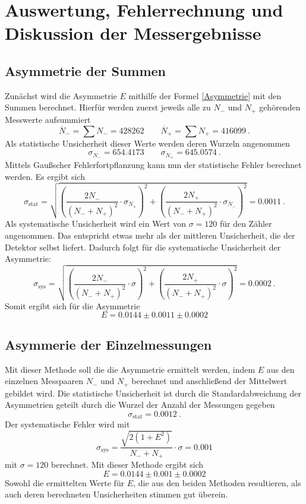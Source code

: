 \chapter{Auswertung, Fehlerrechnung und Diskussion der Messergebnisse}
\section{Asymmetrie der Summen}
Zunächst wird die Asymmetrie $E$ mithilfe der Formel \ref{Asymmetrie} mit den Summen berechnet. Hierfür werden zuerst jeweils alle zu $N_{-}$ und $N_{+}$ gehörenden Messwerte aufsummiert
 \begin{equation*}
     \overline{N}_{-} = \sum N_{-} = 428262 \qquad \overline{N}_{+} = \sum N_{+} = 416099 ~.
 \end{equation*}
 Als statistische Unsicherheit dieser Werte werden deren Wurzeln angenommen
  \begin{equation*}
     \sigma_{N_{-}} = 654.4173 \qquad \sigma_{N_{+}} = 645.0574 ~.
 \end{equation*}
 Mittels Gaußscher Fehlerfortpflanzung kann nun der statistische Fehler berechnet werden. Es ergibt sich
 \begin{equation*}
     \sigma_\text{stat} = \sqrt{\left(\frac{2N_{-}}{(N_{-}+N_{+})^{2}} \cdot \sigma_{N_{+}}\right)^{2} + \left(\frac{2N_{+}}{(N_{-}+N_{+})^{2}} \cdot \sigma_{N_{-}}\right)^{2}} = 0.0011 ~.
 \end{equation*}
Als systematische Unsicherheit wird ein Wert von $\sigma=120$ für den Zähler angenommen. Das entspricht etwas mehr als der mittleren Unsicherheit, die der Detektor selbst liefert.  Dadurch folgt für die systematische Unsicherheit der Asymmetrie:  
 \begin{equation*}
     \sigma_\text{sys} = \sqrt{\left(\frac{2N_{-}}{(N_{-}+N_{+})^{2}} \cdot \sigma \right)^{2} + \left(\frac{2N_{+}}{(N_{-}+N_{+})^{2}} \cdot \sigma \right)^{2}} = 0.0002 ~.
 \end{equation*}
Somit ergibt sich für die Asymmetrie $$E=0.0144 \pm 0.0011 \pm 0.0002$$
    

\section{Asymmerie der Einzelmessungen}
Mit dieser Methode soll die die Asymmetrie ermittelt werden, indem $E$ aus den einzelnen Messpaaren $N_{-}$ und $N_{+}$ berechnet und anschließend der Mittelwert gebildet wird. Die statistische Unsicherheit ist durch die Standardabweichung der Asymmetrien geteilt durch die Wurzel der Anzahl der Messungen gegeben $$\sigma_\text{stat}=0.0012~.$$ Der systematische Fehler wird mit 
 \begin{equation*}
     \sigma_\text{sys} = \frac{\sqrt{2(1+E^{2})}}{N_{-}+N_{+}} \cdot \sigma = 0.001
 \end{equation*}
mit $\sigma=120$ berechnet. Mit dieser Methode ergibt sich $$E=0.0144 \pm 0.001 \pm 0.0002$$
Sowohl die ermittelten Werte für $E$, die aus den beiden Methoden resultieren, als auch deren berechneten Unsicherheiten stimmen gut überein. 


